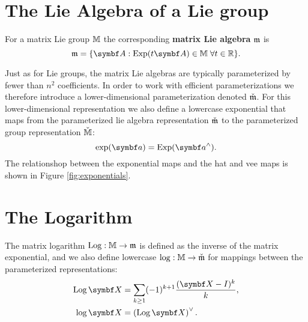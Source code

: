 \section{The Lie Algebra of a Lie group}

\begin{definition}
  For a matrix Lie group $\mathbb{M}$ the corresponding \textbf{matrix Lie algebra} $\mathfrak{m}$ is
  \begin{equation}
    \lM = \{ \A : \Exp(t \A) \in \mathbb{M} \; \forall t \in \mathbb{R} \}.
  \end{equation}
\end{definition}
Just as for Lie groups, the matrix Lie algebras are typically parameterized by fewer than $n^2$ coefficients. In order to work with efficient parameterizations we therefore introduce a lower-dimensional parameterization denoted $\check{\mathfrak{m}}$. For this lower-dimensional representation we also define a lowercase exponential that maps from the parameterized lie algebra representation $\check{\mathfrak{m}}$ to the parameterized group representation $\check{\mathbb{M}}$:
\begin{equation}
  \exp (\a) = \Exp(\a^{\wedge}).
\end{equation}
The relationshop between the exponential maps and the hat and vee maps is shown in Figure \ref{fig:exponentials}.


\section{The Logarithm}

The matrix logarithm $\operatorname{Log} : \mathbb{M} \rightarrow \mathfrak{m}$ is defined as the inverse of the matrix exponential, and we also define lowercase $\log : \mathbb{M} \rightarrow \check{\mathfrak{m}}$ for mappings between the parameterized representations:
\begin{equation}
  \begin{aligned}
    \Log \X & = \sum_{k \geq 1} (-1)^{k+1} \frac{(\X - I)^k}{k}, \\
    \log \X & = \left( \Log \X \right)^{\vee}.
  \end{aligned}
\end{equation}


